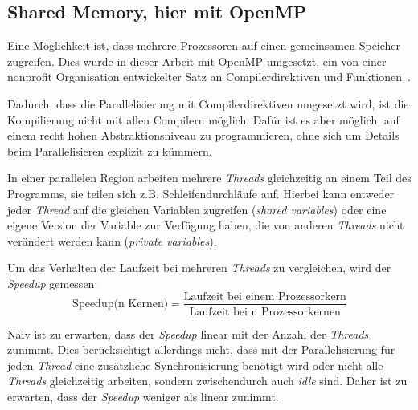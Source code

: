 	\subsection{Shared Memory, hier mit OpenMP}
	\label{subsec:openmptheorie}
	Eine Möglichkeit ist, dass mehrere Prozessoren auf einen gemeinsamen Speicher zugreifen\cite[vgl. ][S. 209]{pachecoparallel}. Dies wurde in dieser Arbeit mit OpenMP umgesetzt, ein von einer nonprofit Organisation entwickelter Satz an Compilerdirektiven und Funktionen~\cite{specificationsopenmp}.
	
	Dadurch, dass die Parallelisierung mit Compilerdirektiven umgesetzt wird, ist die Kompilierung nicht mit allen Compilern möglich. Dafür ist es aber möglich, auf einem recht hohen Abstraktionsniveau zu programmieren, ohne sich um Details beim Parallelisieren explizit zu kümmern\cite[vgl. ][S. 209]{pachecoparallel}.	
	
	In einer parallelen Region arbeiten mehrere \textit{Threads} gleichzeitig an einem Teil des Programms, sie teilen sich z.{}B.{} Schleifendurchläufe auf. Hierbei kann entweder jeder \textit{Thread} auf die gleichen Variablen zugreifen (\textit{shared variables}) oder eine eigene Version der Variable zur Verfügung haben, die von anderen \textit{Threads} nicht verändert werden kann (\textit{private variables})\cite[vgl. ][S. 231 f.]{pachecoparallel}. 
	
	Um das Verhalten der Laufzeit bei mehreren \textit{Threads} zu vergleichen, wird der \textit{Speedup} gemessen:
	\begin{equation}
	\text{Speedup(n Kernen)}=\frac{\text{Laufzeit bei einem Prozessorkern}}{\text{Laufzeit bei n Prozessorkernen}}
	\label{eq:speedup}
	\end{equation}
	
	Naiv ist zu erwarten, dass der \textit{Speedup} linear mit der Anzahl der \textit{Threads} zunimmt. Dies berücksichtigt allerdings nicht, dass mit der Parallelisierung für jeden \textit{Thread} eine zusätzliche Synchronisierung benötigt wird oder nicht alle \textit{Threads} gleichzeitig arbeiten, sondern zwischendurch auch \textit{idle} sind. Daher ist zu erwarten, dass der \textit{Speedup} weniger als linear zunimmt\cite[vgl. ][S. 58 f.]{pachecoparallel}.
	
	
	
